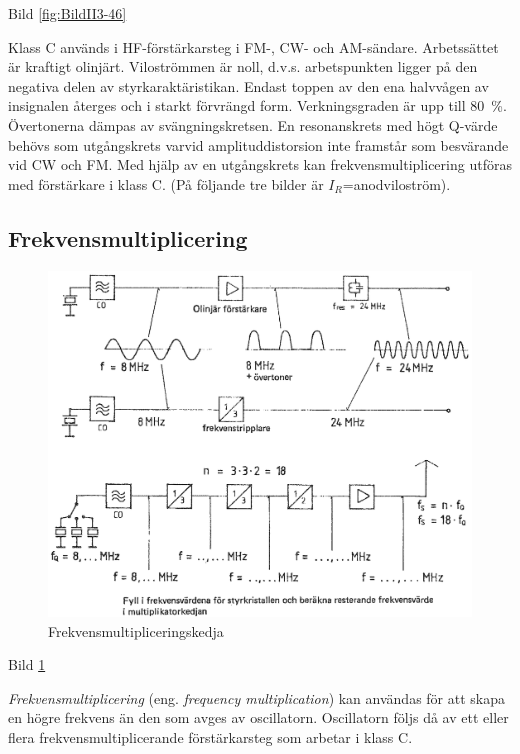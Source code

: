 Bild \ref{fig:BildII3-46}

Klass C används i HF-förstärkarsteg i FM-, CW- och
AM-sändare. Arbetssättet är kraftigt olinjärt. Viloströmmen är noll,
d.v.s. arbetspunkten ligger på den negativa delen av
styrkaraktäristikan. Endast toppen av den ena halvvågen av insignalen
återges och i starkt förvrängd form. Verkningsgraden är upp till
80~\%. Övertonerna dämpas av svängningskretsen. En resonanskrets med
högt Q-värde behövs som utgångskrets varvid amplituddistorsion inte
framstår som besvärande vid CW och FM. Med hjälp av en utgångskrets
kan frekvensmultiplicering utföras med förstärkare i klass C.  (På
följande tre bilder är \(I_R\)=anodviloström).

\subsection{Frekvensmultiplicering}

\begin{figure}
\includegraphics[width=\textwidth]{images/cropped_pdfs/bild_2_3-47.pdf}
\caption{Frekvensmultipliceringskedja}
\label{fig:BildII3-47}
\end{figure}

Bild \ref{fig:BildII3-47}

\emph{Frekvensmultiplicering} (eng. \emph{frequency multiplication}) kan
användas för att skapa en högre frekvens än den som avges av oscillatorn.
Oscillatorn följs då av ett eller flera frekvensmultiplicerande förstärkarsteg
som arbetar i klass C.

